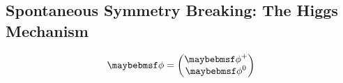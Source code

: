 
\subsection{Spontaneous Symmetry Breaking: The Higgs Mechanism}

% 
 
\begin{equation}
\phi = 
\everymath{\displaystyle} \begin{pmatrix}
\phi^{+} \\ 
\phi^{0}
\end{pmatrix}
\end{equation}


